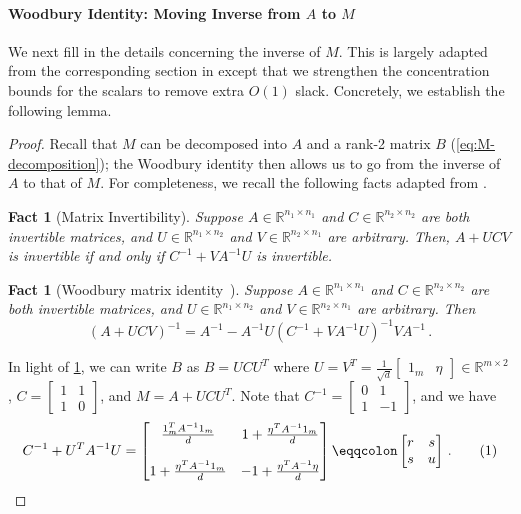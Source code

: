 \documentclass[12pt]{article}
\def \R {\mathbb{R}}
\newtheorem{fact}[theorem]{Fact}
\newcommand\numberthis{\addtocounter{equation}{1}\tag{\theequation}}
\begin{document}
\paragraph{Woodbury Identity: Moving Inverse from $A$ to $M$} We next fill in the details concerning the inverse of $M$. This is largely adapted from the corresponding section in \cite{HKPX23} except that we strengthen the concentration bounds for the scalars to remove extra $O(1)$ slack. Concretely, we establish the following lemma.
\Minverse*
\begin{proof}
  Recall that $M$ can be decomposed into $A$ and a rank-2 matrix $B$ (\cref{eq:M-decomposition}); the Woodbury identity then allows us to go from the inverse of $A$ to that of $M$. For completeness, we recall the following facts adapted from \cite{HKPX23}.
  
  \begin{fact}[Matrix Invertibility] \label{fact:invertibility}
    Suppose $A \in \R^{n_1 \times n_1}$ and $C \in \R^{n_2 \times n_2}$ are both invertible matrices, and $U\in \R^{n_1 \times n_2}$ and $V \in \R^{n_2 \times n_1}$ are arbitrary.
    Then, $A + U C V$ is invertible if and only if $C^{-1} + V A^{-1} U$ is invertible.
\end{fact}

\begin{fact}[Woodbury matrix identity~\cite{Woodbury1950}]  \label{fact:woodbury}
    Suppose $A \in \R^{n_1 \times n_1}$ and $C \in \R^{n_2 \times n_2}$ are both invertible matrices, and $U\in \R^{n_1 \times n_2}$ and $V \in \R^{n_2 \times n_1}$ are arbitrary. Then
    \[ 
    (A+ UCV)^{-1} = A^{-1} - A^{-1}U\left(C^{-1}+ VA^{-1}U\right)^{-1}VA^{-1}  \,.
    \]
\end{fact}

In light of \cref{fact:woodbury}, we can write $B$ as $B = UCU^T$ where $U = V^T = \frac{1}{\sqrt{d}} \begin{bmatrix} 1_m & \eta \end{bmatrix} \in \R^{m \times 2}$, %
$C = \begin{bmatrix} 1 & 1 \\ 1 & 0 \end{bmatrix}$,
and $M = A + UCU^T$.
Note that $C^{-1} = \begin{bmatrix} 0 & 1 \\ 1 & -1 \end{bmatrix}$, and we have
\begin{align*}
    C^{-1} + U^T A^{-1}U  = \begin{bmatrix}
	\frac{1_m^T A^{-1} 1_m}{d} & 1 + \frac{\eta^T A^{-1} 1_m}{d}\\\\
	1+ \frac{\eta^T A^{-1} 1_m}{d} & -1 + \frac{\eta^T A^{-1} \eta }{d} 
    \end{bmatrix}
    \eqqcolon
    \begin{bmatrix}
    	r & s \\
    	s & u
    \end{bmatrix}
    \,. 
    \numberthis \label{eq:russ}
\end{align*}


\end{proof}
\end{document}
